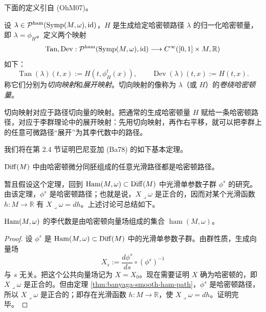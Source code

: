 下面的定义引自 (OhM07)。

\begin{definition}
\label{def:tangent-developing-maps}
设 $\lambda\in\mathcal P^{\mathrm{ham}}(\operatorname{Symp}(M,\omega),\operatorname{id})$，$H$ 是生成给定哈密顿路径 $\lambda$ 的归一化哈密顿量，即 $\lambda=\phi_H$。定义两个映射
\[
 \operatorname{Tan},\operatorname{Dev}:
 \mathcal P^{\mathrm{ham}}(\operatorname{Symp}(M,\omega),\operatorname{id})
 \longrightarrow C^\infty([0,1]\times M,\mathbb R)
\]
如下：
\[
 \operatorname{Tan}(\lambda)(t,x):=H(t,\phi_H^t(x)),
 \qquad
 \operatorname{Dev}(\lambda)(t,x):=H(t,x).
\]
称它们分别为\emph{切向映射}和\emph{展开映射}。切向映射的像称为 $\lambda$（或 $H$）的\emph{卷绕哈密顿量}。
\end{definition}

切向映射对应于路径切向量的映射。把通常的生成哈密顿量 $H$ 赋给一条哈密顿路径，对应于李群理论中的展开映射：先用切向映射，再作右平移，就可以把李群上的任意可微路径“展开”为其李代数中的路径。

我们将在第 2.4 节证明巴尼亚加 (Ba78) 的如下基本定理。

\begin{theorem}[巴尼亚加]
\label{thm:banyaga-smooth-ham-path}
$\operatorname{Diff}(M)$ 中由哈密顿微分同胚组成的任意光滑路径都是哈密顿路径。
\end{theorem}

暂且假设这个定理，回到 $\operatorname{Ham}(M,\omega)\subset\operatorname{Diff}(M)$ 中光滑单参数子群 $\phi^s$ 的研究。由该定理，$\phi^s$ 是哈密顿路径；也就是说，$X\mathbin{\lrcorner}\omega$ 是正合的，因而对某个光滑函数 $h:M\to\mathbb R$ 有 $X\mathbin{\lrcorner}\omega=dh$。上述讨论可总结如下。

\begin{corollary}
\label{cor:lie-algebra-ham}
$\operatorname{Ham}(M,\omega)$ 的李代数是由哈密顿向量场组成的集合 $\operatorname{ham}(M,\omega)$。
\end{corollary}

\begin{proof}
设 $\phi^s$ 是 $\operatorname{Ham}(M,\omega)\subset\operatorname{Diff}(M)$ 中的光滑单参数子群。由群性质，生成向量场
\[
  X_s:=\frac{d\phi^s}{ds}\circ(\phi^s)^{-1}
\]
与 $s$ 无关。把这个公共向量场记为 $X=X_0$。现在需要证明 $X$ 确为哈密顿的，即 $X\mathbin{\lrcorner}\omega$ 是正合的。但由定理 \ref{thm:banyaga-smooth-ham-path}，$\phi^s$ 是哈密顿路径，所以 $X\mathbin{\lrcorner}\omega$ 是正合的；即存在光滑函数 $h:M\to\mathbb R$，使 $X\mathbin{\lrcorner}\omega=dh$。证明完毕。
\end{proof}

